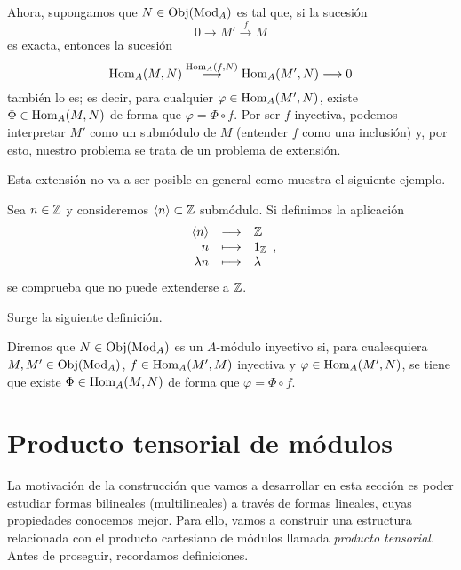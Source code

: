 \documentclass[../main.tex]{subfiles}
\begin{document}
Ahora, supongamos que $N\in\operatorname{Obj}(\operatorname{Mod}_A)$ es tal que, si la sucesión
$$0\longrightarrow M'\overset{f}{\longrightarrow}M$$
es exacta, entonces la sucesión
$$\operatorname{Hom}_A(M,N)\overset{\operatorname{Hom}_A(f,N)}{\longrightarrow}\operatorname{Hom}_A(M',N)\longrightarrow0$$
también lo es; es decir, para cualquier $\varphi\in\operatorname{Hom}_A(M',N)$, existe $\Phi\in\operatorname{Hom}_A(M,N)$ de forma que $\varphi=\Phi\circ f$. Por ser $f$ inyectiva, podemos interpretar $M'$ como un submódulo de $M$ (entender $f$ como una inclusión) y, por esto, nuestro problema se trata de un problema de extensión.

Esta extensión no va a ser posible en general como muestra el siguiente ejemplo.
\begin{example}
    Sea $n\in\mathbb{Z}$ y consideremos $\langle n\rangle\subset\mathbb{Z}$ submódulo. Si definimos la aplicación
    $$\begin{array}{rcl}
        \langle n\rangle&\longrightarrow&\mathbb{Z}\\
        n&\longmapsto&1_{\mathbb{Z}}\\
        \lambda n&\longmapsto&\lambda
    \end{array},$$
    se comprueba que no puede extenderse a $\mathbb{Z}$.
\end{example}

Surge la siguiente definición.

\begin{definition}
    Diremos que $N\in\operatorname{Obj}(\operatorname{Mod}_A)$ es un $A$-módulo inyectivo si, para cualesquiera $M,M'\in\operatorname{Obj}(\operatorname{Mod}_A)$, $f\in\operatorname{Hom}_A(M',M)$ inyectiva y $\varphi\in\operatorname{Hom}_A(M',N)$, se tiene que existe $\Phi\in\operatorname{Hom}_A(M,N)$ de forma que $\varphi=\Phi\circ f$.
\end{definition}

\section{Producto tensorial de módulos}

La motivación de la construcción que vamos a desarrollar en esta sección es poder estudiar formas bilineales (multilineales) a través de formas lineales, cuyas propiedades conocemos mejor. Para ello, vamos a construir una estructura relacionada con el producto cartesiano de módulos llamada \emph{producto tensorial}. Antes de proseguir, recordamos definiciones.
\end{document}
